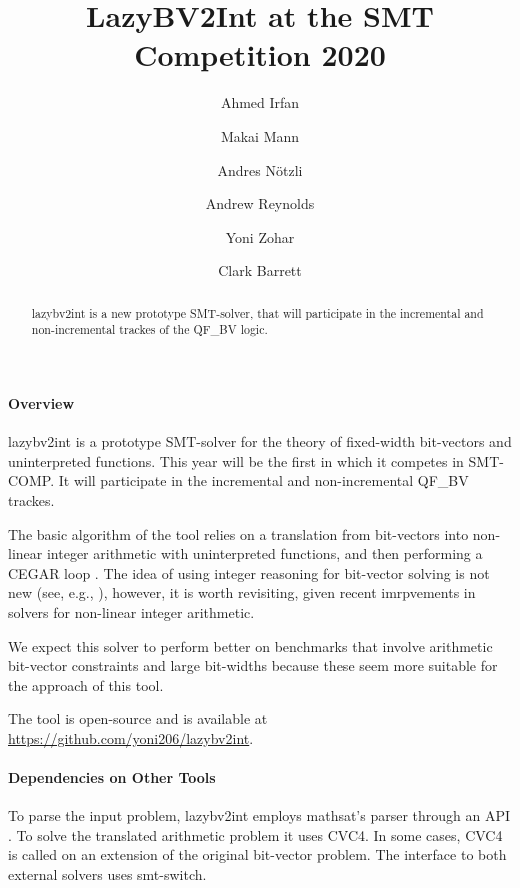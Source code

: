 \documentclass{easychair}
\newcommand{\lazybvtoint}{lazybv2int\xspace}
\newcommand{\smtcomp}{SMT-COMP\xspace}
\newcommand{\qfbv}{QF\_BV\xspace}
\newcommand{\msat}{mathsat\xspace}
\newcommand{\cvcfour}{CVC4\xspace}
\newcommand{\smtswitch}{smt-switch\xspace}
\begin{document}
\author{
		Ahmed Irfan \and
		Makai Mann \and
		Andres N\"otzli \and
		Andrew Reynolds\and
		Yoni Zohar\and
		Clark Barrett
}

\title{LazyBV2Int at the SMT Competition 2020}

\maketitle


\noindent
\begin{abstract}
\lazybvtoint is a new prototype SMT-solver, that  will participate in the incremental and non-incremental trackes of the \qfbv logic.
\end{abstract}

\paragraph{Overview}
\lazybvtoint is a prototype SMT-solver for the theory of fixed-width bit-vectors and uninterpreted functions.
This year will be the first in which it competes in \smtcomp.
It will participate in the incremental and non-incremental \qfbv trackes.

The basic algorithm of the tool relies on a translation from bit-vectors into
non-linear integer arithmetic with uninterpreted functions, and then performing
a CEGAR loop \cite{}.
The idea of using integer reasoning for bit-vector solving is not new (see, e.g., \cite{}), however, it is worth revisiting, given recent imrpvements in solvers for non-linear integer arithmetic.

We expect this solver to perform better on benchmarks that involve arithmetic
bit-vector constraints and large bit-widths because these seem
more suitable for the approach of this tool.

The tool is open-source and is available at \url{https://github.com/yoni206/lazybv2int}.

\paragraph{Dependencies on Other Tools}
%
To parse the input problem, \lazybvtoint employs \msat's
parser through an API \cite{mathsat5}.
To solve the translated arithmetic problem it uses \cvcfour \cite{cvc4}.
In some cases, \cvcfour is called on an extension of the original bit-vector problem.
%
The interface to both external solvers uses
\smtswitch \cite{smtswitchgithub}.
\end{document}
